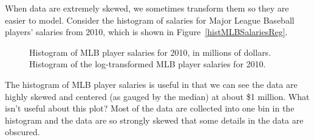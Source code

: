 When data are extremely skewed, we sometimes transform them so they are easier to model.
Consider the histogram of salaries for Major League Baseball players' salaries from 2010, which is shown in Figure~\ref{histMLBSalariesReg}.
\begin{figure}[ht]
\centering
{}
\caption{ Histogram of MLB player salaries for 2010, in millions of dollars.  Histogram of the log-transformed MLB player salaries for 2010.}
\label{histMLBSalaries}
\end{figure}

\begin{example}{The histogram of MLB player salaries is useful in that we can see the data are highly skewed and centered (as gauged by the median) at about \$1 million. What isn't useful about this plot?}
Most of the data are collected into one bin in the histogram and the data are so strongly skewed that some details in the data are obscured.
\end{example}

